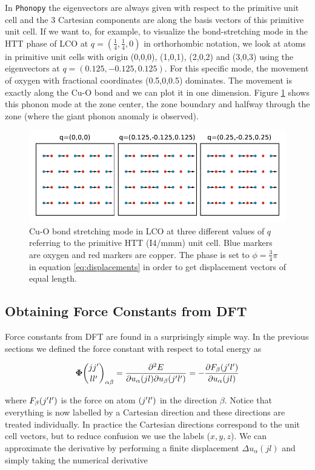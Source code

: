In \texttt{Phonopy} the eigenvectors are always given with respect to the primitive unit cell and the 3 Cartesian components are along the basis vectors of this primitive unit cell. If we want to, for example, to visualize the bond-stretching mode in the HTT phase of LCO at $q=(\frac{1}{4},\frac{1}{4},0)$ in orthorhombic notation, we look at atoms in primitive unit cells with origin (0,0,0), (1,0,1), (2,0,2) and (3,0,3) using the eigenvectors at $q=(0.125,-0.125,0.125)$. For this specific mode, the movement of oxygen with fractional coordinates (0.5,0,0.5) dominates. The movement is exactly along the Cu-O bond and we can plot it in one dimension. Figure \ref{fig:bs-displacements} shows this phonon mode at the zone center, the zone boundary and halfway through the zone (where the giant phonon anomaly is observed).

\begin{figure}
	\centering
	\includegraphics{fig/temp/bs-phonons.pdf}
	\caption[bond-stretching phonons visualized]{Cu-O bond stretching mode in LCO at three different values of $q$ referring to the primitive HTT (I4/mmm) unit cell. Blue markers are oxygen and red markers are copper. The phase is set to $\phi=\frac{3}{4}\pi$ in equation \ref{eq:displacements} in order to get displacement vectors of equal length.}
	\label{fig:bs-displacements}
\end{figure}

\subsection{Obtaining Force Constants from DFT}\label{sec:forceDFT}
Force constants from DFT are found in a surprisingly simple way. In the previous sections we defined the force constant with respect to total energy as

\[ \fc  _{\alpha \beta} = \frac{\partial ^2 E}{\partial u_\alpha (jl) \partial u_\beta (\jp \lp)} = - \frac{\partial F_\beta (\jp \lp)}{\partial u_\alpha (jl)} \]

\noindent where $F_\beta (j^\prime l^\prime)$ is the force on atom $(j^\prime l^\prime)$ in the direction $\beta$. Notice that everything is now labelled by a Cartesian direction and these directions are treated individually. In practice the Cartesian directions correspond to the unit cell vectors, but to reduce confusion we use the labels ($x,y,z$). We can approximate the derivative by performing a finite displacement $\Delta u_\alpha(jl)$ and simply taking the numerical derivative


